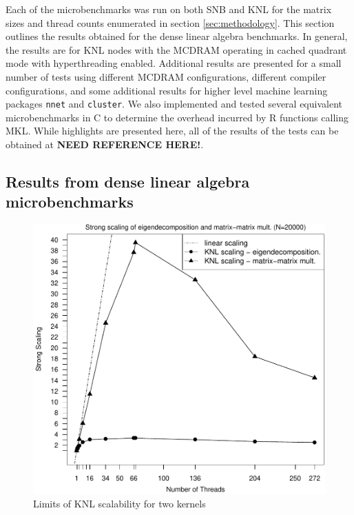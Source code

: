 Each of the microbenchmarks was run on both SNB and KNL for the matrix sizes and thread
counts enumerated in section \ref{sec:methodology}. This section outlines the results
obtained for the dense linear algebra benchmarks. In general, the results are for KNL
nodes with the MCDRAM operating in cached quadrant mode with hyperthreading enabled.
Additional results are presented for a small number of tests using different MCDRAM
configurations, different compiler configurations, and some additional results for higher
level machine learning packages \texttt{nnet} and \texttt{cluster}. We also implemented
and tested several equivalent microbenchmarks in C to determine the overhead incurred by R
functions calling MKL. While highlights are presented here, all of the results of the
tests can be obtained at {\bf NEED REFERENCE HERE!}.

\subsection{Results from dense linear algebra microbenchmarks}

\begin{figure}
\includegraphics[height=\columnwidth, width=\columnwidth]{eigen_matmat_20000_272_knl-ss.pdf}
\caption{Limits of KNL scalability for two kernels}
\label{fig:knlScalabilityLimits}
\end{figure}

